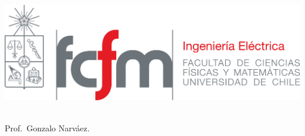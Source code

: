 \documentclass[
  11pt,
  letterpaper,
  answers
]{exam}
\begin{document}
\begin{minipage}{0.42\textwidth}
    \includegraphics[width=\textwidth]{../fcfm_die}
\end{minipage}
\begin{minipage}{0.53\textwidth}
\begin{center} 
\large\textbf{} \\
\normalsize Prof.~Gonzalo Narváez.
\end{center}
\end{minipage}
\end{document}
